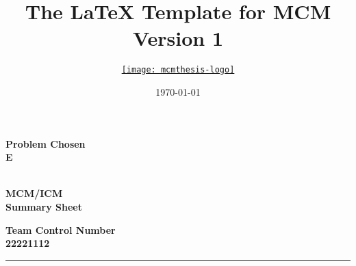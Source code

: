 \documentclass[12pt]{article}
\title{The \LaTeX{} Template for MCM Version 1}
\author{\small \href{http://www.latexstudio.net/}
  {\texttt{[image: mcmthesis-logo]}}}
\date{\today}
\gdef\MCMcontrol{22221112}%
\newcommand{\problem}{E}%
\newcommand{\headset}{{\the\year}\\MCM/ICM\\Summary Sheet}
\begin{document}
\thispagestyle{empty}
\begingroup
  \setlength{\parindent}{0pt}
     \begin{minipage}[t]{0.33\linewidth}
     \bfseries\centering%
      Problem Chosen\\[0.7pc]
      {\Huge\textbf{\problem}}\\[2.8pc]
     \end{minipage}%
     \begin{minipage}[t]{0.33\linewidth}
      \centering%
      \textbf{\headset}%
     \end{minipage}%
     \begin{minipage}[t]{0.33\linewidth}
      \centering\bfseries%
       Team Control Number\\[0.7pc]
      {\Huge\textbf{\MCMcontrol}}\\[2.8pc]
     \end{minipage}\par
  \rule{\linewidth}{0.8pt}\par
  \par
  \endgroup
\end{document}

